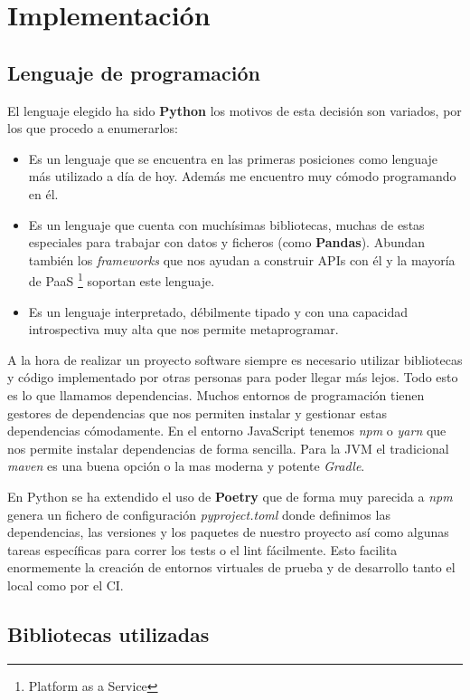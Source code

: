 \section{Implementación}
\subsection{Lenguaje de programación}
El lenguaje elegido ha sido \textbf{Python} los motivos de esta decisión son variados, por los que procedo a enumerarlos:
\begin{itemize}
    \item Es un lenguaje que se encuentra en las \cite{tiobe} primeras posiciones como lenguaje más utilizado a día de hoy. Además me encuentro muy cómodo programando en él.
    \item Es un lenguaje que cuenta con muchísimas bibliotecas, muchas de estas especiales para trabajar con datos y ficheros (como \textbf{Pandas}). Abundan también los \textit{frameworks} que nos ayudan a construir APIs con él y la mayoría de PaaS \footnote{Platform as a Service} soportan este lenguaje.
    \item Es un lenguaje interpretado, débilmente tipado y con una capacidad introspectiva muy alta que nos permite metaprogramar.
\end{itemize}

A la hora de realizar un proyecto software siempre es necesario utilizar bibliotecas y código implementado por otras personas para poder llegar más lejos. Todo esto es lo que llamamos dependencias. Muchos entornos de programación tienen gestores de dependencias que nos permiten instalar y gestionar estas dependencias cómodamente. En el entorno JavaScript tenemos \textit{npm} o \textit{yarn} que nos permite instalar dependencias de forma sencilla. Para la JVM el tradicional \textit{maven} es una buena opción o la mas moderna y potente \textit{Gradle}.

En Python se ha extendido el uso de \textbf{Poetry} que de forma muy parecida a \textit{npm} genera un fichero de configuración \textit{pyproject.toml} donde definimos las dependencias, las versiones y los paquetes de nuestro proyecto así como algunas tareas específicas para correr los tests o el lint fácilmente. Esto facilita enormemente la creación de entornos virtuales de prueba y de desarrollo tanto el local como por el CI.

\subsection{Bibliotecas utilizadas}

